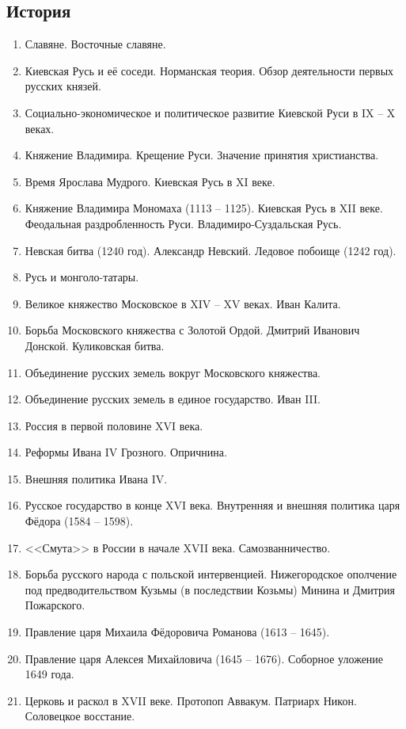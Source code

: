 \documentclass{article}
\begin{document}
\subsection*{История}
\begin{enumerate}
	\item Славяне. Восточные славяне.
	\item Киевская Русь и её соседи. Норманская теория. Обзор деятельности первых русских князей.
	\item Социально-экономическое и политическое развитие Киевской Руси в IX -- X веках.
	\item Княжение Владимира. Крещение Руси. Значение принятия христианства.
	\item Время Ярослава Мудрого. Киевская Русь в XI веке.
	\item Княжение Владимира Мономаха (1113 -- 1125). Киевская Русь в XII веке. Феодальная раздробленность Руси. Владимиро-Суздальская Русь.
	\item Невская битва (1240 год). Александр Невский. Ледовое побоище (1242 год).
	\item Русь и монголо-татары.
	\item Великое княжество Московское в XIV -- XV веках. Иван Калита.
	\item Борьба Московского княжества с Золотой Ордой. Дмитрий Иванович Донской. Куликовская битва.
	\item Объединение русских земель вокруг Московского княжества.
	\item Объединение русских земель в единое государство. Иван III.
	\item Россия в первой половине XVI века.
	\item Реформы Ивана IV Грозного. Опричнина.
	\item Внешняя политика Ивана IV.
	\item Русское государство в конце XVI века. Внутренняя и внешняя политика царя Фёдора (1584 -- 1598).
	\item <<Смута>> в России в начале XVII века. Самозванничество.
	\item Борьба русского народа с польской интервенцией. Нижегородское ополчение под предводительством Кузьмы (в последствии Козьмы) Минина и Дмитрия Пожарского.
	\item Правление царя Михаила Фёдоровича Романова (1613 -- 1645).
	\item Правление царя Алексея Михайловича (1645 -- 1676). Соборное уложение 1649 года.
	\item Церковь и раскол в XVII веке. Протопоп Аввакум. Патриарх Никон. Соловецкое восстание.

\end{enumerate}
\end{document}

